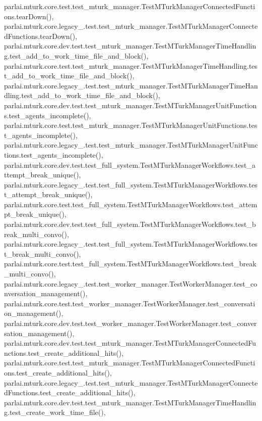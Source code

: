 parlai.\+mturk.\+core.\+test.\+test\+\_\+mturk\+\_\+manager.\+Test\+M\+Turk\+Manager\+Connected\+Functions.\+tear\+Down(), parlai.\+mturk.\+core.\+legacy\+\_.\+test.\+test\+\_\+mturk\+\_\+manager.\+Test\+M\+Turk\+Manager\+Connected\+Functions.\+tear\+Down(), parlai.\+mturk.\+core.\+dev.\+test.\+test\+\_\+mturk\+\_\+manager.\+Test\+M\+Turk\+Manager\+Time\+Handling.\+test\+\_\+add\+\_\+to\+\_\+work\+\_\+time\+\_\+file\+\_\+and\+\_\+block(), parlai.\+mturk.\+core.\+test.\+test\+\_\+mturk\+\_\+manager.\+Test\+M\+Turk\+Manager\+Time\+Handling.\+test\+\_\+add\+\_\+to\+\_\+work\+\_\+time\+\_\+file\+\_\+and\+\_\+block(), parlai.\+mturk.\+core.\+legacy\+\_.\+test.\+test\+\_\+mturk\+\_\+manager.\+Test\+M\+Turk\+Manager\+Time\+Handling.\+test\+\_\+add\+\_\+to\+\_\+work\+\_\+time\+\_\+file\+\_\+and\+\_\+block(), parlai.\+mturk.\+core.\+dev.\+test.\+test\+\_\+mturk\+\_\+manager.\+Test\+M\+Turk\+Manager\+Unit\+Functions.\+test\+\_\+agents\+\_\+incomplete(), parlai.\+mturk.\+core.\+test.\+test\+\_\+mturk\+\_\+manager.\+Test\+M\+Turk\+Manager\+Unit\+Functions.\+test\+\_\+agents\+\_\+incomplete(), parlai.\+mturk.\+core.\+legacy\+\_.\+test.\+test\+\_\+mturk\+\_\+manager.\+Test\+M\+Turk\+Manager\+Unit\+Functions.\+test\+\_\+agents\+\_\+incomplete(), parlai.\+mturk.\+core.\+dev.\+test.\+test\+\_\+full\+\_\+system.\+Test\+M\+Turk\+Manager\+Workflows.\+test\+\_\+attempt\+\_\+break\+\_\+unique(), parlai.\+mturk.\+core.\+legacy\+\_.\+test.\+test\+\_\+full\+\_\+system.\+Test\+M\+Turk\+Manager\+Workflows.\+test\+\_\+attempt\+\_\+break\+\_\+unique(), parlai.\+mturk.\+core.\+test.\+test\+\_\+full\+\_\+system.\+Test\+M\+Turk\+Manager\+Workflows.\+test\+\_\+attempt\+\_\+break\+\_\+unique(), parlai.\+mturk.\+core.\+dev.\+test.\+test\+\_\+full\+\_\+system.\+Test\+M\+Turk\+Manager\+Workflows.\+test\+\_\+break\+\_\+multi\+\_\+convo(), parlai.\+mturk.\+core.\+legacy\+\_.\+test.\+test\+\_\+full\+\_\+system.\+Test\+M\+Turk\+Manager\+Workflows.\+test\+\_\+break\+\_\+multi\+\_\+convo(), parlai.\+mturk.\+core.\+test.\+test\+\_\+full\+\_\+system.\+Test\+M\+Turk\+Manager\+Workflows.\+test\+\_\+break\+\_\+multi\+\_\+convo(), parlai.\+mturk.\+core.\+legacy\+\_.\+test.\+test\+\_\+worker\+\_\+manager.\+Test\+Worker\+Manager.\+test\+\_\+conversation\+\_\+management(), parlai.\+mturk.\+core.\+test.\+test\+\_\+worker\+\_\+manager.\+Test\+Worker\+Manager.\+test\+\_\+conversation\+\_\+management(), parlai.\+mturk.\+core.\+dev.\+test.\+test\+\_\+worker\+\_\+manager.\+Test\+Worker\+Manager.\+test\+\_\+conversation\+\_\+management(), parlai.\+mturk.\+core.\+dev.\+test.\+test\+\_\+mturk\+\_\+manager.\+Test\+M\+Turk\+Manager\+Connected\+Functions.\+test\+\_\+create\+\_\+additional\+\_\+hits(), parlai.\+mturk.\+core.\+test.\+test\+\_\+mturk\+\_\+manager.\+Test\+M\+Turk\+Manager\+Connected\+Functions.\+test\+\_\+create\+\_\+additional\+\_\+hits(), parlai.\+mturk.\+core.\+legacy\+\_.\+test.\+test\+\_\+mturk\+\_\+manager.\+Test\+M\+Turk\+Manager\+Connected\+Functions.\+test\+\_\+create\+\_\+additional\+\_\+hits(), parlai.\+mturk.\+core.\+dev.\+test.\+test\+\_\+mturk\+\_\+manager.\+Test\+M\+Turk\+Manager\+Time\+Handling.\+test\+\_\+create\+\_\+work\+\_\+time\+\_\+file(), 